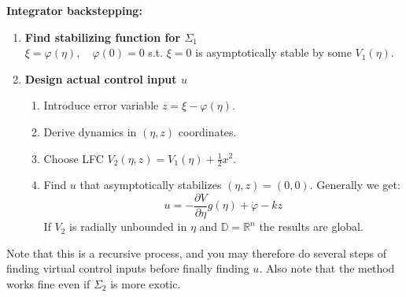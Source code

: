 \begin{tcolorbox}[colback=white, colframe=teal]
    \textbf{Integrator backstepping:}
    \begin{enumerate}
        \item \textbf{Find stabilizing function for $\Sigma_1$}\\
        $\xi=\varphi(\eta), \quad \varphi(0)=0$ s.t. $\xi = 0$ is asymptotically stable by some $V_1(\eta)$.
        \item \textbf{Design actual control input $u$}
        \begin{enumerate}
            \item Introduce error variable $z=\xi-\varphi(\eta)$.
            \item Derive dynamics in $(\eta, z)$ coordinates.
            \item Choose LFC $V_2(\eta, z) = V_1(\eta) + \frac{1}{2}x^2$.
            \item Find $u$ that asymptotically stabilizes $(\eta, z) = (0,0)$. Generally we get:
            \begin{equation}
                u=-\frac{\partial V}{\partial \eta} g(\eta)+\dot{\varphi}-k z
            \end{equation}
            If $V_2$ is radially unbounded in $\eta$ and $\mathbb{D} = \mathbb{R}^n$ the results are global.
        \end{enumerate}
    \end{enumerate}
\end{tcolorbox}
\begin{remark}
    Note that this is a recursive process, and you may therefore do several steps of finding virtual control inputs before finally finding $u$. Also note that the method works fine even if $\Sigma_2$ is more exotic.
\end{remark}
